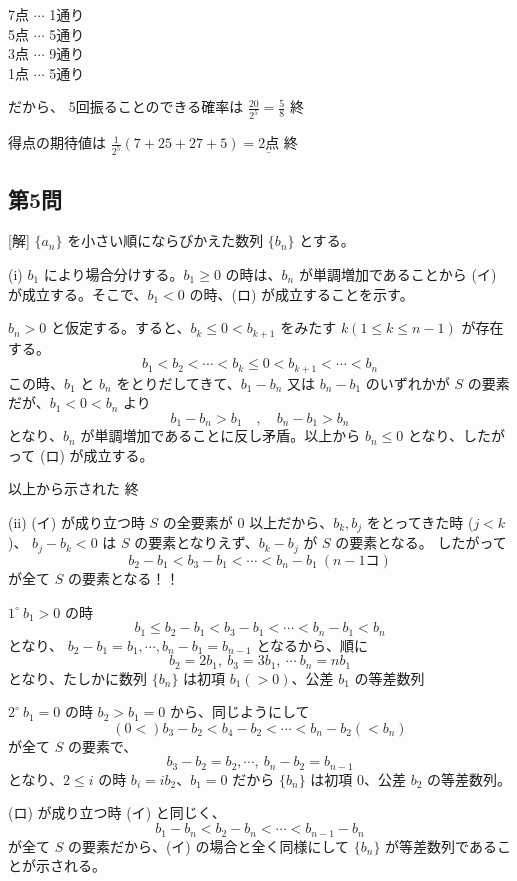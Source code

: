 \documentclass[../main.tex]{subfiles}
\begin{document}
7点 $\cdots$ 1通り \\
5点 $\cdots$ 5通り \\
3点 $\cdots$ 9通り \\
1点 $\cdots$ 5通り

だから、
5回振ることのできる確率は $\frac{20}{2^5} = \frac{5}{8}$ 終

得点の期待値は $\frac{1}{2^5} (7+25+27+5) = \underline{2 \text{点}}$ 終

\subsection*{第5問}
[解] $\{a_n\}$ を小さい順にならびかえた数列 $\{b_n\}$ とする。

(i) $b_1$ により場合分けする。$b_1 \ge 0$ の時は、$b_n$ が単調増加であることから (イ) が成立する。そこで、$b_1 < 0$ の時、(ロ) が成立することを示す。

$b_n > 0$ と仮定する。すると、$b_k \le 0 < b_{k+1}$ をみたす $k (1 \le k \le n-1)$ が存在する。
\[ b_1 < b_2 < \cdots < b_k \le 0 < b_{k+1} < \cdots < b_n \]
この時、$b_1$ と $b_n$ をとりだしてきて、$b_1-b_n$ 又は $b_n-b_1$ のいずれかが $S$ の要素だが、$b_1 < 0 < b_n$ より
\[ b_1 - b_n > b_1 \quad, \quad b_n - b_1 > b_n \]
となり、$b_n$ が単調増加であることに反し矛盾。以上から $b_n \le 0$ となり、したがって (ロ) が成立する。

以上から示された 終

(ii) (イ) が成り立つ時
$S$ の全要素が $0$ 以上だから、$b_k, b_j$ をとってきた時 ($j<k$)、
$b_j - b_k < 0$ は $S$ の要素となりえず、$b_k - b_j$ が $S$ の要素となる。
したがって
\[ b_2 - b_1 < b_3 - b_1 < \cdots < b_n - b_1 \ (n-1\text{コ}) \]
が全て $S$ の要素となる！！

$1^{\circ} \ b_1 > 0$ の時
\[ b_1 \le b_2 - b_1 < b_3 - b_1 < \cdots < b_n - b_1 < b_n \]
となり、
$b_2 - b_1 = b_1, \cdots, b_n - b_1 = b_{n-1}$ となるから、順に
\[ b_2 = 2b_1, \ b_3 = 3b_1, \ \cdots \ b_n = nb_1 \]
となり、たしかに数列 $\{b_n\}$ は初項 $b_1(>0)$、公差 $b_1$ の等差数列

$2^{\circ} \ b_1 = 0$ の時
$b_2 > b_1 = 0$ から、同じようにして
\[ (0 < ) b_3 - b_2 < b_4 - b_2 < \cdots < b_n - b_2 (< b_n) \]
が全て $S$ の要素で、
\[ b_3 - b_2 = b_2, \cdots, \ b_n - b_2 = b_{n-1} \]
となり、$2 \le i$ の時 $b_i = i b_2$、$b_1=0$ だから $\{b_n\}$ は初項 $0$、公差 $b_2$ の等差数列。

(ロ) が成り立つ時
(イ) と同じく、
\[ b_1 - b_n < b_2 - b_n < \cdots < b_{n-1} - b_n \]
が全て $S$ の要素だから、(イ) の場合と全く同様にして $\{b_n\}$ が等差数列であることが示される。
\end{document}

